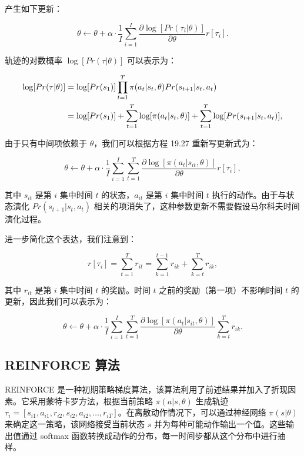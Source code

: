 \documentclass[lang=cn,newtx,10pt,scheme=chinese]{elegantbook}
\begin{document}
产生如下更新：

\begin{equation}
\theta \leftarrow \theta + \alpha \cdot \frac{1}{I} \sum_{i=1}^{I} \frac{\partial \log [Pr(\tau_i|\theta)]}{\partial \theta} r[\tau_i]. 
\end{equation}

轨迹的对数概率 \(\log[Pr(\tau|\theta)]\) 可以表示为：


\begin{align}
\log[Pr(\tau|\theta)] &= \log [Pr(s_1)] \prod_{t=1}^{T} \pi(a_t|s_t, \theta) Pr(s_{t+1}|s_t, a_t) \notag\\
&= \log [Pr(s_1)] + \sum_{t=1}^{T} \log [\pi(a_t|s_t, \theta)] + \sum_{t=1}^{T} \log [Pr(s_{t+1}|s_t, a_t)], 
\end{align} 


由于只有中间项依赖于 \(\theta\)，我们可以根据方程 19.27 重新写更新式为：

\begin{equation}
\theta \leftarrow \theta + \alpha \cdot \frac{1}{I} \sum_{i=1}^{I} \sum_{t=1}^{T} \frac{\partial \log [\pi(a_t|s_{it}, \theta)]}{\partial \theta} r[\tau_i], 
\end{equation}

其中 \(s_{it}\) 是第 \(i\) 集中时间 \(t\) 的状态，\(a_{it}\) 是第 \(i\) 集中时间 \(t\) 执行的动作。由于与状态演化 \(Pr(s_{t+1}|s_t, a_t)\) 相关的项消失了，这种参数更新不需要假设马尔科夫时间演化过程。

进一步简化这个表达，我们注意到：

\begin{equation}
r[\tau_i] = \sum_{t=1}^{T} r_{it} = \sum_{k=1}^{t-1} r_{ik} + \sum_{k=t}^{T} r_{ik}, 
\end{equation}

其中 \(r_{it}\) 是第 \(i\) 集中时间 \(t\) 的奖励。时间 \(t\) 之前的奖励（第一项）不影响时间 \(t\) 的更新，因此我们可以表示为：

\begin{equation}
\theta \leftarrow \theta + \alpha \cdot \frac{1}{I} \sum_{i=1}^{I} \sum_{t=1}^{T} \frac{\partial \log [\pi(a_t|s_{it}, \theta)]}{\partial \theta} \sum_{k=t}^{T} r_{ik}. 
\end{equation}

\subsection{REINFORCE 算法}
REINFORCE 是一种初期策略梯度算法，该算法利用了前述结果并加入了折现因素。它采用蒙特卡罗方法，根据当前策略 \(\pi(a|s, \theta)\) 生成轨迹 \(\tau_i = [s_{i1}, a_{i1}, r_{i2}, s_{i2}, a_{i2}, \ldots, r_{iT}]\)。在离散动作情况下，可以通过神经网络 \(\pi(s|\theta)\) 来确定这一策略，该网络接受当前状态 \(s\) 并为每种可能动作输出一个值。这些输出值通过 softmax 函数转换成动作的分布，每一时间步都从这个分布中进行抽样。
\end{document}
